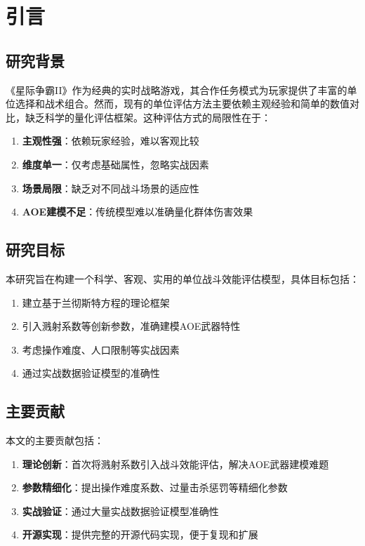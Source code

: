 \documentclass[a4paper,12pt]{article}
\begin{document}
\pagestyle{fancy}
\fancyhf{}
\lhead{\leftmark}
\rhead{\thepage}
\renewcommand{\headrulewidth}{0.4pt}

\section{引言}

\subsection{研究背景}

《星际争霸II》作为经典的实时战略游戏，其合作任务模式为玩家提供了丰富的单位选择和战术组合。然而，现有的单位评估方法主要依赖主观经验和简单的数值对比，缺乏科学的量化评估框架。这种评估方式的局限性在于：

\begin{enumerate}
    \item \textbf{主观性强}：依赖玩家经验，难以客观比较
    \item \textbf{维度单一}：仅考虑基础属性，忽略实战因素
    \item \textbf{场景局限}：缺乏对不同战斗场景的适应性
    \item \textbf{AOE建模不足}：传统模型难以准确量化群体伤害效果
\end{enumerate}

\subsection{研究目标}

本研究旨在构建一个科学、客观、实用的单位战斗效能评估模型，具体目标包括：

\begin{enumerate}
    \item 建立基于兰彻斯特方程的理论框架
    \item 引入溅射系数等创新参数，准确建模AOE武器特性
    \item 考虑操作难度、人口限制等实战因素
    \item 通过实战数据验证模型的准确性
\end{enumerate}

\subsection{主要贡献}

本文的主要贡献包括：

\begin{enumerate}
    \item \textbf{理论创新}：首次将溅射系数引入战斗效能评估，解决AOE武器建模难题
    \item \textbf{参数精细化}：提出操作难度系数、过量击杀惩罚等精细化参数
    \item \textbf{实战验证}：通过大量实战数据验证模型准确性
    \item \textbf{开源实现}：提供完整的开源代码实现，便于复现和扩展
\end{enumerate}
\end{document}
